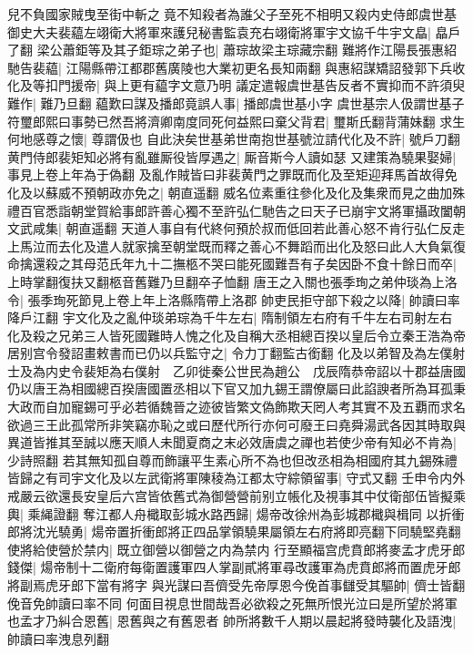 兒不負國家賊曳至街中斬之竟不知殺者為誰父子至死不相明又殺内史侍郎虞世基御史大夫裴藴左翊衛大將軍來護兒秘書監袁充右翊衛將軍宇文協千牛宇文皛|{
	皛戶了翻}
梁公蕭鉅等及其子鉅琮之弟子也|{
	蕭琮故梁主琮藏宗翻}
難將作江陽長張惠紹馳告裴藴|{
	江陽縣帶江都郡舊廣陵也大業初更名長知兩翻}
與惠紹謀矯詔發郭下兵收化及等扣門援帝|{
	與上更有藴字文意乃明}
議定遣報虞世基告反者不實抑而不許須臾難作|{
	難乃旦翻}
藴歎曰謀及播郎竟誤人事|{
	播郎虞世基小字}
虞世基宗人伋謂世基子符璽郎熙曰事勢已然吾將濟卿南度同死何益熙曰棄父背君|{
	璽斯氏翻背蒲妹翻}
求生何地感尊之懷|{
	尊謂伋也}
自此決矣世基弟世南抱世基號泣請代化及不許|{
	號戶刀翻}
黄門侍郎裴矩知必將有亂雖厮役皆厚遇之|{
	厮音斯今人讀如瑟}
又建策為驍果娶婦|{
	事見上卷上年為于偽翻}
及亂作賊皆曰非裴黄門之罪既而化及至矩迎拜馬首故得免化及以蘇威不預朝政亦免之|{
	朝直遥翻}
威名位素重往參化及化及集衆而見之曲加殊禮百官悉詣朝堂賀給事郎許善心獨不至許弘仁馳告之曰天子已崩宇文將軍攝政闔朝文武咸集|{
	朝直遥翻}
天道人事自有代終何預於叔而低回若此善心怒不肯行弘仁反走上馬泣而去化及遣人就家擒至朝堂既而釋之善心不舞蹈而出化及怒曰此人大負氣復命擒還殺之其母范氏年九十二撫柩不哭曰能死國難吾有子矣因卧不食十餘日而卒|{
	上時掌翻復扶又翻柩音舊難乃旦翻卒子恤翻}
唐王之入關也張季珣之弟仲琰為上洛令|{
	張季珣死節見上卷上年上洛縣隋帶上洛郡}
帥吏民拒守部下殺之以降|{
	帥讀曰率降戶江翻}
宇文化及之亂仲琰弟琮為千牛左右|{
	隋制領左右府有千牛左右司射左右}
化及殺之兄弟三人皆死國難時人愧之化及自稱大丞相總百揆以皇后令立秦王浩為帝居别宫令發詔畫敕書而已仍以兵監守之|{
	令力丁翻監古銜翻}
化及以弟智及為左僕射士及為内史令裴矩為右僕射　乙卯徙秦公世民為趙公　戊辰隋恭帝詔以十郡益唐國仍以唐王為相國總百揆唐國置丞相以下官又加九錫王謂僚屬曰此諂諛者所為耳孤秉大政而自加寵錫可乎必若循魏晉之迹彼皆繁文偽飾欺天罔人考其實不及五覇而求名欲過三王此孤常所非笑竊亦恥之或曰歷代所行亦何可廢王曰堯舜湯武各因其時取與異道皆推其至誠以應天順人未聞夏商之末必效唐虞之禪也若使少帝有知必不肯為|{
	少詩照翻}
若其無知孤自尊而飾讓平生素心所不為也但改丞相為相國府其九錫殊禮皆歸之有司宇文化及以左武衛將軍陳稜為江都太守綜領留事|{
	守式又翻}
壬申令内外戒嚴云欲還長安皇后六宫皆依舊式為御營營前别立帳化及視事其中仗衛部伍皆擬乘輿|{
	乘䋲證翻}
奪江都人舟檝取彭城水路西歸|{
	煬帝改徐州為彭城郡檝與楫同}
以折衝郎將沈光驍勇|{
	煬帝置折衝郎將正四品掌領驍果屬領左右府將即亮翻下同驍堅堯翻}
使將給使營於禁内|{
	既立御營以御營之内為禁内}
行至顯福宫虎賁郎將麥孟才虎牙郎錢傑|{
	煬帝制十二衛府每衛置護軍四人掌副貳將軍尋改護軍為虎賁郎將而置虎牙郎將副焉虎牙郎下當有將字}
與光謀曰吾儕受先帝厚恩今俛首事讎受其驅帥|{
	儕士皆翻俛音免帥讀曰率不同}
何面目視息世間哉吾必欲殺之死無所恨光泣曰是所望於將軍也孟才乃糾合恩舊|{
	恩舊與之有舊恩者}
帥所將數千人期以晨起將發時襲化及語洩|{
	帥讀曰率洩息列翻}
